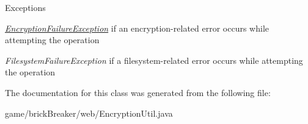 \begin{DoxyExceptions}{Exceptions}
\item[{\em \hyperlink{classbrick_breaker_1_1web_1_1_encryption_failure_exception}{EncryptionFailureException}}]if an encryption-\/related error occurs while attempting the operation \item[{\em FilesystemFailureException}]if a filesystem-\/related error occurs while attempting the operation \end{DoxyExceptions}


The documentation for this class was generated from the following file:\begin{DoxyCompactItemize}
\item 
game/brickBreaker/web/EncryptionUtil.java\end{DoxyCompactItemize}
